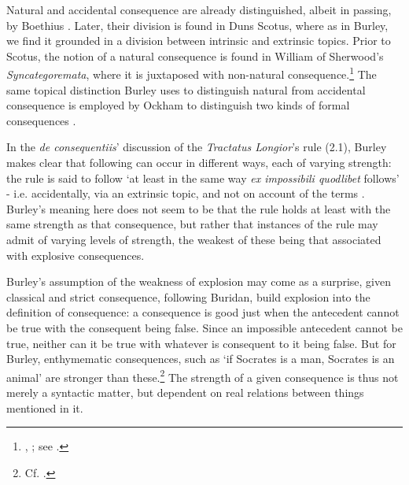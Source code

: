 	Natural and accidental consequence are already distinguished, albeit in passing, by Boethius \autocite[835B]{BHS}. Later, their division is found in Duns Scotus, where as in Burley, we find it grounded in a division between intrinsic and extrinsic topics. Prior to Scotus, the notion of a natural consequence is found in William of Sherwood's \textit{Syncategoremata}, where it is juxtaposed with non-natural consequence.\footnote{\autocite[I, d. 11, q. 2, p. 136-137]{ScotusLectura}, \autocite[p. 80]{Sherwood1941}; see \autocite{Martin2012}.} The same topical distinction Burley uses to distinguish natural from accidental consequence is employed by Ockham to distinguish two kinds of formal consequences \autocite[III-3. 1, p. 589]{OckhamSL}.
	
	In the \textit{de consequentiis}' discussion of the \textit{Tractatus Longior}'s rule (2.1), Burley makes clear that following can occur in different ways, each of varying strength: the rule is said to follow `at least in the same way \textit{ex impossibili quodlibet} follows' - i.e. accidentally, via an extrinsic topic, and not on account of the terms \autocite[p. 132, par. 85]{Green-Pedersen1980b}. Burley's meaning here does not seem to be that the rule holds at least with the same strength as that consequence, but rather that instances of the rule may admit of varying levels of strength, the weakest of these being that associated with explosive consequences.
	
	Burley's assumption of the weakness of explosion may come as a surprise, given classical and strict consequence, following Buridan, build explosion into the definition of consequence: a consequence is good just when the antecedent cannot be true with the consequent being false. Since an impossible antecedent cannot be true, neither can it be true with whatever is consequent to it being false. But for Burley, enthymematic consequences, such as `if Socrates is a man, Socrates is an animal' are stronger than these.\footnote{Cf. \cite[pp. 333-337]{Klima2016}.} The strength of a given consequence is thus not merely a syntactic matter, but dependent on real relations between things mentioned in it. 
